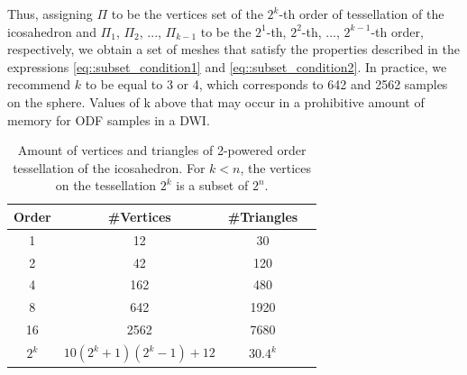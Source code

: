 \documentclass[twoside,twocolumn,10pt]{article}
\begin{document}
Thus, assigning $\Pi$ to be the vertices set of the $2^k$-th order of tessellation of the icosahedron and $\Pi_1$, $\Pi_2$, ..., $\Pi_{k-1}$ to be the $2^{1}$-th, $2^{2}$-th, ..., $2^{k-1}$-th order, respectively, we obtain a set of meshes that satisfy the properties described in the expressions \ref{eq::subset_condition1} and \ref{eq::subset_condition2}. In practice, we recommend $k$ to be equal to 3 or 4, which corresponds to 642 and 2562 samples on the sphere. Values of k above that may occur in a prohibitive amount of memory for ODF samples in a DWI.


\begin{table}[]
\centering
\begin{tabular}{|c|c|c|c|}
\hline
\textbf{Order} & \textbf{\#Vertices} & \textbf{\#Triangles} \\ \hline
1              & 12                 & 30                  \\ \hline
2              & 42                 & 120                 \\ \hline
4              & 162                & 480                 \\ \hline
8              & 642                & 1920                \\ \hline
16             & 2562               & 7680                \\ \hline
$2^k$          & $10(2^k+1)(2^k-1)+12$ & $30.4^k$           \\ \hline
\end{tabular}
\caption{Amount of vertices and triangles of 2-powered order tessellation of the icosahedron. For $k<n$, the vertices on the tessellation $2^k$ is a subset of $2^n$.}
\label{tab::icosahedron_set}
\end{table}


\end{document}

